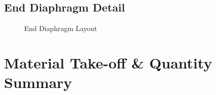 \documentclass[12pt,a4paper]{report}
\numberwithin{table}{chapter}
\numberwithin{figure}{chapter}
\begin{document}
\section{End Diaphragm Detail}
\label{sec:diaphragm-detail}

\begin{figure}[H]
\centering
{}
\caption{End Diaphragm Layout}
\label{fig:ed-layout}
\end{figure}


\noindent
\begin{minipage}[t]{0.31\textwidth}
\centering
{}
\label{fig:ed-bracing-sec}
\end{minipage}
\hfill
\begin{minipage}[t]{0.31\textwidth}
\centering
{}
\label{fig:ed-top-chord}
\end{minipage}
\hfill
\begin{minipage}[t]{0.31\textwidth}
\centering
{}
\label{fig:ed-bottom-chord}
\end{minipage}



\chapter{Material Take-off \& Quantity Summary}
\label{ch:material-takeoff}
\end{document}
